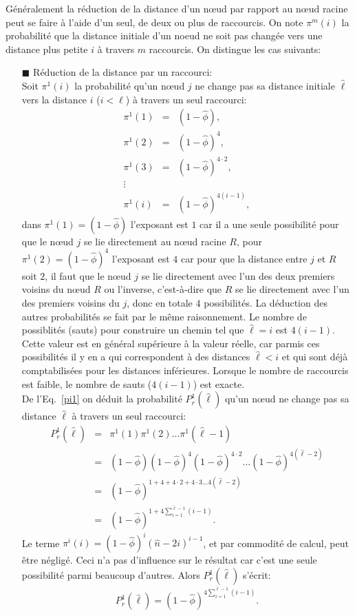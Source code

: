 \noindent Généralement la réduction de la distance d'un nœud par rapport au nœud racine peut se faire à l'aide d'un seul, de deux ou plus de raccourcis. On note $\pi^m(i)$ la probabilité que la distance initiale d'un noeud ne soit pas changée  vers une distance plus petite $i$ à travers $m$ raccourcis. On distingue  les cas suivants:\\
\begin{itemize}
\item[$\blacksquare$]  Réduction de la distance par un raccourci:\\
Soit $\pi^1(i)$ la probabilité qu'un nœud $j$ ne change pas sa distance initiale $\hat{\ell}$ vers
la distance $i$ ($i<\hat{\ell}$) à travers un seul raccourci:
\begin{eqnarray}\nonumber
	\pi^1(1)&=&(1-\hat{\phi}), \\\nonumber
	\pi^1(2)&=&(1-\hat{\phi})^4,\\\nonumber
	\pi^1(3)&=&(1-\hat{\phi})^{4\cdot2},\\\nonumber
	\vdots\\
	\pi^1(i)&=&(1-\hat{\phi})^{4(i-1)},
	\label{pi1}
	\end{eqnarray}
dans $\pi^1(1)=(1-\hat{\phi})$ l'exposant est $1$ car il a une seule possibilité pour que le nœud $j$ se lie directement au nœud racine $R$, pour $\pi^1(2)=(1-\hat{\phi})^4$  l'exposant est $4$ car pour que la distance entre $j$ et $R$ soit $2$, il faut que le nœud $j$ se lie directement avec l'un des deux premiers voisins du nœud $R$ ou l'inverse, c'est-à-dire que $R$ se lie directement avec l'un des premiers voisins du $j$, donc en totale $4$ possibilités. La déduction des autres probabilités se fait par le même raisonnement.
Le nombre de possiblités (sauts) pour construire un chemin tel que $\hat{\ell}=i$ est $4(i-1)$. Cette valeur est en général supérieure à la valeur réelle, car parmis ces possibilités il y en a qui correspondent à des distances $\hat{\ell}<i$ et qui sont déjà comptabilisées pour les distances inférieures. Lorsque le nombre de raccourcis est faible, le nombre de sauts ($4(i-1)$) est exacte. \\
De l'Eq.~\eqref{pi1} on déduit la probabilité $P^1_r(\hat{\ell})$ qu'un nœud ne change pas sa distance $\hat{\ell}$ à travers un seul raccourci:
\begin{eqnarray}\nonumber
P_r^1(\hat{\ell})&=&\pi^1(1)\pi^1(2)...\pi^1(\hat{\ell}-1)\\\nonumber
&=& (1-\hat{\phi})(1-\hat{\phi})^4(1-\hat{\phi})^{4\cdot2}...(1-\hat{\phi})^{4(\hat{\ell}-2)}\\\nonumber
&=&(1-\hat{\phi})^{1+4+4\cdot2+4\cdot3...4(\hat{\ell}-2)}\\
&=&(1-\hat{\phi})^{1+4\sum_{i=1}^{\hat{\ell}-1}(i-1)}.
\end{eqnarray}
Le terme  $\pi^i(i)=(1-\hat{\phi})^{i}(\hat{n}-2i)^{i-1}$, et par commodité de calcul, peut être négligé. Ceci  n'a pas d'influence sur le résultat car c'est une seule possibilité parmi beaucoup d'autres. Alors $P_r^1(\hat{\ell})$ s'écrit:
\begin{equation}
P_r^1(\hat{\ell})=(1-\hat{\phi})^{4\sum_{i=1}^{\hat{\ell}-1}(i-1)}.
\end{equation}
	

\end{itemize}
